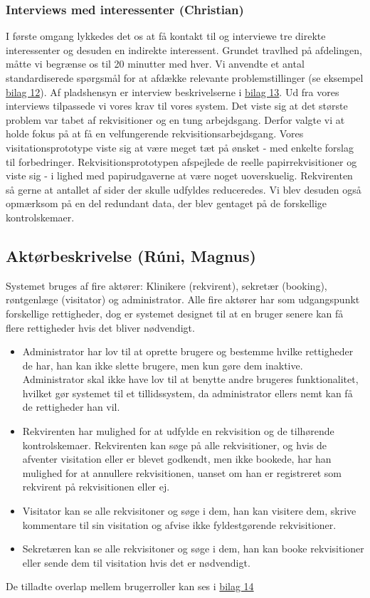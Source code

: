 \subsubsection*{Interviews med interessenter (Christian)}
I første omgang lykkedes det os at få kontakt til og interviewe tre direkte
interessenter og desuden en indirekte interessent. Grundet travlhed på
afdelingen, måtte vi begrænse os til 20 minutter med hver. Vi anvendte et antal
standardiserede spørgsmål for at afdække relevante
problemstillinger\cite{designing} (se eksempel \hyperref[Bilag12]{bilag 12}). Af
pladshensyn er interview beskrivelserne i \hyperref[Bilag13]{bilag 13}.
\indent Ud fra vores interviews tilpassede vi vores krav til vores system. Det
viste sig at det største problem var tabet af rekvisitioner og en tung
arbejdsgang. Derfor valgte vi at holde fokus på at få en velfungerende
rekvisitionsarbejdsgang. Vores visitationsprototype viste sig at være meget tæt
på ønsket - med enkelte forslag til forbedringer. Rekvisitionsprototypen
afspejlede de reelle papirrekvisitioner og viste sig - i lighed med
papirudgaverne at være noget uoverskuelig. Rekvirenten så gerne at antallet af
sider der skulle udfyldes reduceredes. Vi blev desuden også opmærksom på en del
redundant data, der blev gentaget på de forskellige kontrolskemaer.
\subsection*{Aktørbeskrivelse (Rúni, Magnus)}
Systemet bruges af fire aktører: Klinikere (rekvirent), sekretær (booking),
røntgenlæge (visitator) og administrator. Alle fire aktører har som udgangspunkt
forskellige rettigheder, dog er systemet designet til at en bruger senere kan få
flere rettigheder hvis det bliver nødvendigt.
\begin{itemize}
  \item Administrator har lov til at oprette brugere og bestemme hvilke
  rettigheder de har, han kan ikke slette brugere, men kun gøre dem inaktive.
  Administrator skal ikke have lov til at benytte andre brugeres funktionalitet,
  hvilket gør systemet til et tillidssystem, da administrator ellers nemt kan få
  de rettigheder han vil.
  \item Rekvirenten har mulighed for at udfylde en rekvisition og de tilhørende
  kontrolskemaer. Rekvirenten kan søge på alle rekvisitioner, og hvis de
  afventer visitation eller er blevet godkendt, men ikke bookede, har han
  mulighed for at annullere rekvisitionen, uanset om han er registreret som
  rekvirent på rekvisitionen eller ej.
  \item Visitator kan se alle rekvisitoner og søge i dem, han kan visitere dem,
  skrive kommentare til sin visitation og afvise ikke fyldestgørende rekvisitioner.
  \item Sekretæren kan se alle rekvisitoner og søge i dem, han kan booke
  rekvisitioner eller sende dem til visitation hvis det er nødvendigt.
\end{itemize}
De tilladte overlap mellem brugerroller kan ses i \hyperref[Bilag14]{bilag 14}
